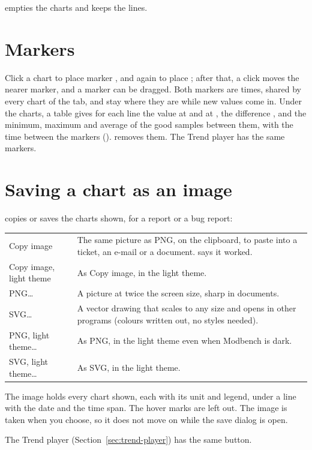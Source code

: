  empties the charts and keeps the lines.

\section{Markers}
\label{sec:markers}

Click a chart to place marker , and again to place ; after that,
a click moves the nearer marker, and a marker can be dragged. Both markers are
times, shared by every chart of the tab, and stay where they are while new
values come in. Under the charts, a table gives for each line the value at
 and at , the difference , and the minimum, maximum and
average of the good samples between them, with the time between the markers
().  removes them. The Trend player has the same
markers.

\section{Saving a chart as an image}
\label{sec:chart-image}

 copies or saves the charts shown, for a report or a bug
report:

\begin{center}
\begin{tabularx}{\linewidth}{l L}
  \toprule
   &  \\
  \midrule
  Copy image & The same picture as PNG, on the clipboard, to paste into a
    ticket, an e-mail or a document.  says it worked. \\
  Copy image, light theme & As Copy image, in the light theme. \\
  PNG… & A picture at twice the screen size, sharp in documents. \\
  SVG… & A vector drawing that scales to any size and opens in other
    programs (colours written out, no styles needed). \\
  PNG, light theme… & As PNG, in the light theme even when Modbench is
    dark. \\
  SVG, light theme… & As SVG, in the light theme. \\
  \bottomrule
\end{tabularx}
\end{center}

The image holds every chart shown, each with its unit and legend, under a line
with the date and the time span. The hover marks are left out. The image is
taken when you choose, so it does not move on while the save dialog is open.

The Trend player (Section~\ref{sec:trend-player}) has the same button.
